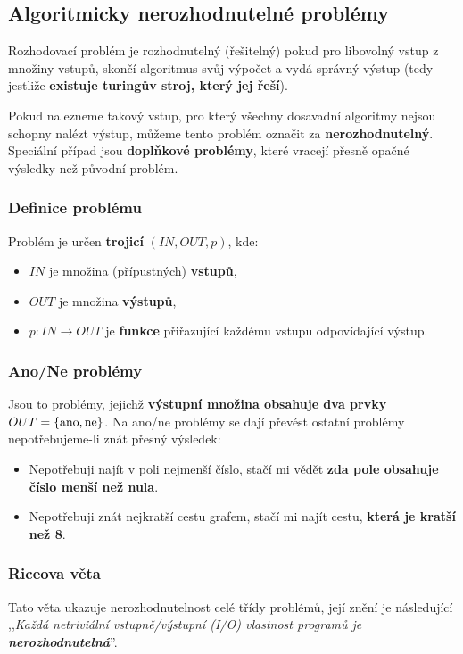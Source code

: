 \subsection{Algoritmicky nerozhodnutelné problémy}
Rozhodovací problém je rozhodnutelný (řešitelný) pokud pro libovolný vstup z množiny vstupů, skončí algoritmus svůj výpočet a vydá správný výstup (tedy jestliže \textbf{existuje turingův stroj, který jej řeší}).

Pokud nalezneme takový vstup, pro který všechny dosavadní algoritmy nejsou schopny nalézt výstup, můžeme tento problém označit za \textbf{nerozhodnutelný}. Speciální případ jsou \textbf{doplňkové problémy}, které vracejí přesně opačné výsledky než původní problém.

\subsubsection{Definice problému}
Problém je určen \textbf{trojicí} $(IN, OUT, p)$, kde:
\begin{itemize}
\item $IN$ je množina (přípustných) \textbf{vstupů},
\item $OUT$ je množina \textbf{výstupů},
\item $p: IN \rightarrow OUT$ je \textbf{funkce} přiřazující každému vstupu odpovídající výstup. 
\end{itemize}

\subsubsection{Ano/Ne problémy}
Jsou to problémy, jejichž \textbf{výstupní množina obsahuje dva prvky} $OUT=\{\rm ano, ne\}$.
 Na ano/ne problémy se dají převést ostatní problémy nepotřebujeme-li znát přesný výsledek:
\begin{itemize}
\item Nepotřebuji najít v poli nejmenší číslo, stačí mi vědět \textbf{zda pole obsahuje číslo menší než nula}.
\item Nepotřebuji znát nejkratší cestu grafem, stačí mi najít cestu, \textbf{která je kratší než 8}.
\end{itemize}

\subsubsection{Riceova věta}
Tato věta ukazuje nerozhodnutelnost celé třídy problémů, její znění je následující ,,\textit{Každá netriviální vstupně/výstupní (I/O) vlastnost programů je \textbf{nerozhodnutelná}}''.

